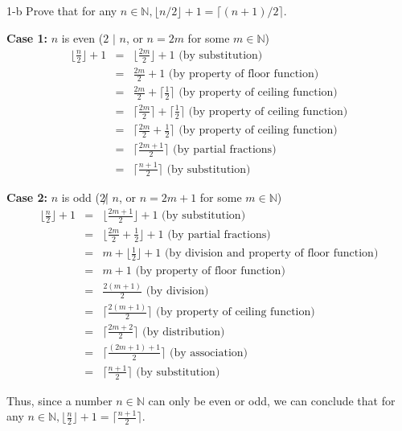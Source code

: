\documentclass[11pt]{article}
\begin{document}
\begin{prob}{1-b}
Prove that for any $n \in \mathbb{N}, \lfloor n/2\rfloor + 1 = \lceil (n+1)/2 \rceil$.
\end{prob}
\begin{sol}
\textbf{Case 1:} $n$ is even ($2$ $|$ $n$, or $n = 2m$ for some $m \in \mathbb{N}$) 
\begin{eqnarray*}
\Big\lfloor\frac{n}{2} \Big\rfloor + 1 & = & \Big\lfloor\frac{2m}{2} \Big\rfloor + 1 \text{ (by substitution)}\\
& = & \frac{2m}{2} + 1 \text{ (by property of floor function)}\\
& = & \frac{2m}{2} + \Big\lceil\frac{1}{2}\Big\rceil \text{ (by property of ceiling function)}\\
& = & \Big\lceil\frac{2m}{2}\Big\rceil + \Big\lceil\frac{1}{2}\Big\rceil \text{ (by property of ceiling function)}\\
& = & \Big\lceil\frac{2m}{2} + \frac{1}{2}\Big\rceil \text{ (by property of ceiling function)}\\
& = & \Big\lceil \frac{2m + 1}{2} \Big\rceil \text{ (by partial fractions)}\\
& = & \Big\lceil\frac{n+1}{2} \Big\rceil \text{ (by substitution)}
\end{eqnarray*}

\textbf{Case 2:} $n$ is odd ($2 \not|$  $n$, or $n = 2m + 1$ for some $m \in \mathbb{N}$) \\
\begin{eqnarray*}
\Big\lfloor\frac{n}{2}\Big\rfloor + 1 & = & \Big\lfloor\frac{2m+1}{2}\Big\rfloor + 1 \text{ (by substitution)}\\
& = & \Big\lfloor\frac{2m}{2} + \frac{1}{2}\Big\rfloor + 1 \text{ (by partial fractions)}\\
& = & m + \Big\lfloor\frac{1}{2}\Big\rfloor + 1 \text{ (by division and property of floor function)}\\
& = & m + 1 \text{ (by property of floor function)}\\
& = & \frac{2(m+1)}{2} \text{ (by division)}\\
& = & \Big\lceil\frac{2(m+1)}{2}\Big\rceil \text{ (by property of ceiling function)}\\
& = & \Big\lceil\frac{2m + 2}{2}\Big\rceil \text{ (by distribution)}\\
& = & \Big\lceil\frac{(2m + 1) + 1}{2}\Big\rceil \text{ (by association)}\\
& = & \Big\lceil\frac{n+1}{2}\Big\rceil \text{ (by substitution)}
\end{eqnarray*}

Thus, since a number $n \in \mathbb{N}$ can only be even or odd, we can conclude that for any $n \in \mathbb{N}, \Big\lfloor\frac{n}{2}\Big\rfloor + 1 = \Big\lceil\frac{n+1}{2}\Big\rceil$.
\end{sol}
\end{document}
